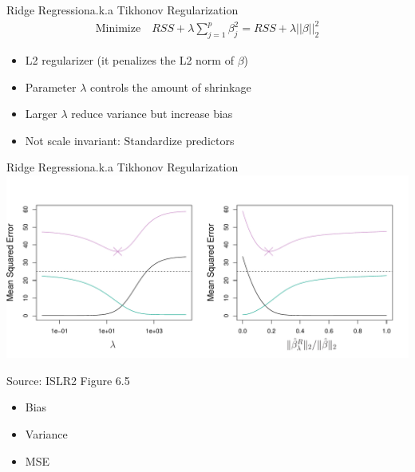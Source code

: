 \documentclass[ignorenonframetext,xcolor=x11names]{beamer}
\begin{document}
\begin{frame}{Ridge Regression}{a.k.a Tikhonov Regularization}
\begin{align*}
\text{Minimize} \quad RSS + \lambda \sum_{j=1}^p \beta_j^2 = RSS + \lambda ||\beta||_2^2
\end{align*}
\begin{itemize}
   \item L2 regularizer (it penalizes the L2 norm of $\beta$)
   \item Parameter $\lambda$ controls the amount of shrinkage
   \item Larger $\lambda$ reduce variance but increase bias
   \item Not scale invariant: Standardize predictors
\end{itemize}
\end{frame}

\begin{frame}{Ridge Regression}{a.k.a Tikhonov Regularization}
\includegraphics[width=\textwidth]{../class11/Figures_Chapters_1-6/Chapter6/6_5.pdf}

\scriptsize Source: ISLR2 Figure 6.5 \normalsize \\

\begin{itemize}
  \item Bias
  \item \color{teal}Variance
  \item \color{magenta}MSE
\end{itemize}

\end{frame}
\end{document}
